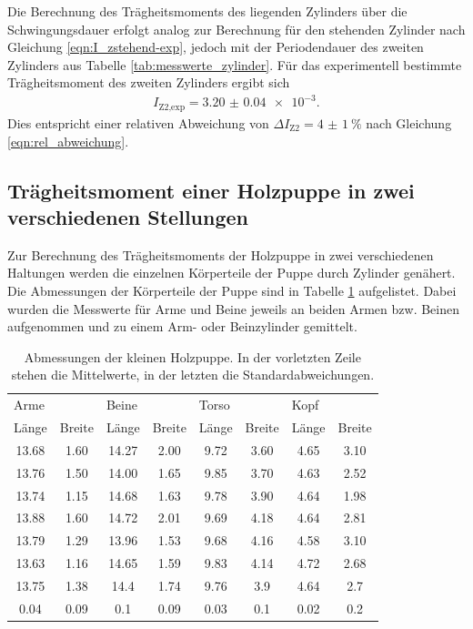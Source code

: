 Die Berechnung des Trägheitsmoments des liegenden Zylinders über die
Schwingungsdauer erfolgt analog zur Berechnung für den stehenden Zylinder nach
Gleichung \eqref{eqn:I_zstehend-exp}, jedoch mit der Periodendauer des
zweiten Zylinders aus Tabelle \ref{tab:messwerte_zylinder}.
Für das experimentell bestimmte Trägheitsmoment des zweiten Zylinders ergibt
sich
\begin{align*}
  I_\text{Z2,exp} = \SI{3.20(4)e-3}.
\end{align*}
Dies entspricht einer relativen Abweichung von $\Delta I_\text{Z2} = \SI{4(1)}
{\percent}$ nach Gleichung \eqref{eqn:rel_abweichung}.


\subsection{Trägheitsmoment einer Holzpuppe in zwei verschiedenen Stellungen}
Zur Berechnung des Trägheitsmoments der Holzpuppe in zwei verschiedenen Haltungen
werden die einzelnen Körperteile der Puppe durch Zylinder genähert. Die Abmessungen
der Körperteile der Puppe sind in Tabelle \ref{tab:abmessungen_puppe} aufgelistet.
Dabei wurden die Messwerte für Arme und Beine jeweils an beiden Armen bzw. Beinen
aufgenommen und zu einem Arm- oder Beinzylinder gemittelt.
\begin{table}
  \centering
  \begin{tabular}{c c c c c c c c}
    \toprule
    \multicolumn{2}{l}{Arme} & \multicolumn{2}{l}{Beine} & \multicolumn{2}{l}{Torso}
    & \multicolumn{2}{l}{Kopf} \\
    Länge & Breite & Länge & Breite & Länge & Breite & Länge & Breite \\
    \midrule
    13.68 & 1.60 & 14.27 & 2.00 & 9.72 & 3.60 & 4.65 & 3.10 \\
    13.76 & 1.50 & 14.00 & 1.65 & 9.85 & 3.70 & 4.63 & 2.52 \\
    13.74 & 1.15 & 14.68 & 1.63 & 9.78 & 3.90 & 4.64 & 1.98 \\
    13.88 & 1.60 & 14.72 & 2.01 & 9.69 & 4.18 & 4.64 & 2.81 \\
    13.79 & 1.29 & 13.96 & 1.53 & 9.68 & 4.16 & 4.58 & 3.10 \\
    13.63 & 1.16 & 14.65 & 1.59 & 9.83 & 4.14 & 4.72 & 2.68 \\
    \midrule
    13.75 & 1.38 & 14.4 & 1.74 & 9.76 & 3.9 & 4.64 & 2.7 \\
    0.04  & 0.09 & 0.1  & 0.09 & 0.03 & 0.1 & 0.02 & 0.2 \\
    \bottomrule
  \end{tabular}
  \caption{Abmessungen der kleinen Holzpuppe. In der vorletzten Zeile stehen die
  Mittelwerte, in der letzten die Standardabweichungen.}
  \label{tab:abmessungen_puppe}
\end{table}

